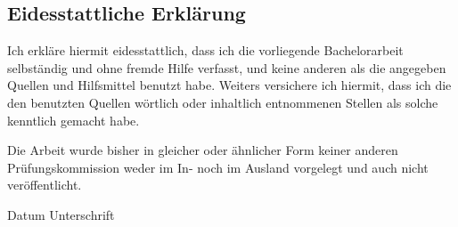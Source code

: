 \subsection*{Eidesstattliche Erklärung}
Ich erkläre hiermit eidesstattlich, dass ich die vorliegende Bachelorarbeit
selbständig und ohne fremde Hilfe verfasst, und keine anderen als die
angegeben Quellen und Hilfsmittel benutzt habe.
Weiters versichere ich hiermit, dass ich die den benutzten Quellen wörtlich
oder inhaltlich entnommenen Stellen als solche kenntlich gemacht habe.

Die Arbeit wurde bisher in gleicher oder ähnlicher Form keiner anderen
Prüfungskommission weder im In- noch im Ausland vorgelegt und auch nicht
veröffentlicht.

\vspace*{3cm}
Datum
\hfill
Unterschrift
